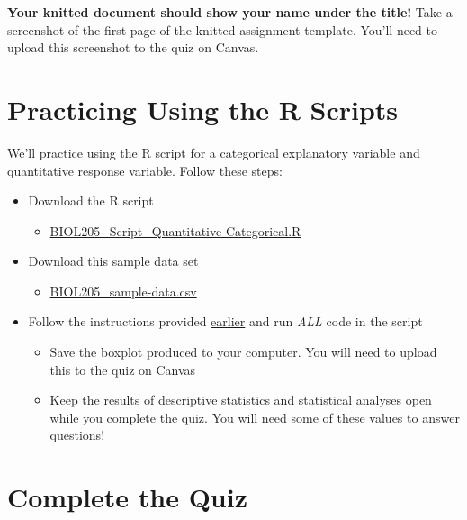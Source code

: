 \documentclass[
]{book}
\providecommand{\tightlist}{%
  \setlength{\itemsep}{0pt}\setlength{\parskip}{0pt}}
\begin{document}
\textbf{Your knitted document should show your name under the title!} Take a screenshot of the first page of the knitted assignment template. You'll need to upload this screenshot to the quiz on Canvas.

\hypertarget{practicing-using-the-r-scripts}{%
\section*{Practicing Using the R Scripts}\label{practicing-using-the-r-scripts}}

We'll practice using the R script for a categorical explanatory variable and quantitative response variable. Follow these steps:

\begin{itemize}
\tightlist
\item
  Download the R script

  \begin{itemize}
  \tightlist
  \item
    \href{https://osf.io/download/46mpk}{BIOL205\_Script\_Quantitative-Categorical.R}
  \end{itemize}
\item
  Download this sample data set

  \begin{itemize}
  \tightlist
  \item
    \href{https://osf.io/download/3r76k}{BIOL205\_sample-data.csv}
  \end{itemize}
\item
  Follow the instructions provided \href{https://ubco-biology.github.io/BIOL-205-Lab-Manual/using-the-rscripts.html}{earlier} and run \emph{ALL} code in the script

  \begin{itemize}
  \tightlist
  \item
    Save the boxplot produced to your computer. You will need to upload this to the quiz on Canvas
  \item
    Keep the results of descriptive statistics and statistical analyses open while you complete the quiz. You will need some of these values to answer questions!
  \end{itemize}
\end{itemize}

\hypertarget{complete-the-quiz}{%
\section*{Complete the Quiz}\label{complete-the-quiz}}
\end{document}
